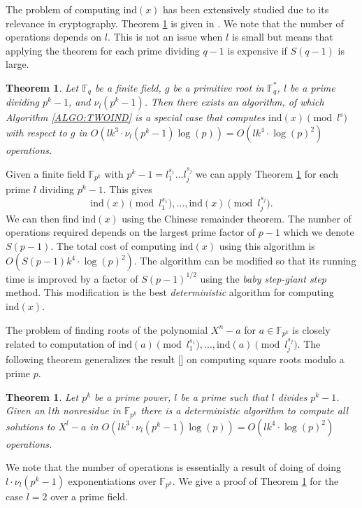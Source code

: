 \documentclass{article}
\newcounter{dummy} \numberwithin{dummy}{section}
\theoremstyle{plain}
\newtheorem{thm}[dummy]{Theorem}
\theoremstyle{definition}
\def\Fq {{ \mathbb{F} _ {q} }}
\def\FQ {{ \mathbb{F}^* _ {q} }}
\def\FpE {{ \mathbb{F} _ {p^k} }}
\def\ind {{ \mathrm{ind} }}
\begin{document}
		The problem of computing $\ind(x)$ has been extensively studied due to its relevance in cryptography. Theorem \ref{THM:ind} is given in \cite{hellman}. We note that the number of operations depends on $l$. This is not an issue when $l$ is small but means that applying the theorem for each prime dividing $q-1$ is expensive if $S(q-1)$ is large. 
		
		\begin{thm}
		\label{THM:ind}
		    Let $\Fq$ be a finite field, $g$ be a primitive root in $\FQ$, $l$ be a prime dividing $p^k-1$, and $\nu_l(p^k-1)$. Then there exists an algorithm, of which Algorithm \ref{ALGO:TWOIND} is a special case that computes $\ind(x) \pmod {l^s}$ with respect to $g$ in $O(lk^3 \cdot \nu_l(p^k - 1)\log(p))=O(lk^4 \cdot \log(p)^2)$ operations.
		\end{thm}
		
		Given a finite field $\FpE$ with $p^k-1=l_1^{s_1} \ldots l_j^{s_j}$ we can apply Theorem \ref{THM:ind} for each prime $l$ dividing $p^k-1$. This gives 
		\[ \ind(x) \pmod {l_1^{s_1}}, \ldots, \ind(x) \pmod {l_j^{s_j}}. \] 
		We can then find $\ind(x)$ using the Chinese remainder theorem. The number of operations required depends on the largest prime factor of $p-1$ which we denote $S(p-1)$. The total cost of computing $\ind(x)$ using this algorithm is $O(S(p-1)k^4 \cdot \log(p)^2)$. The algorithm can be modified so that its running time is improved by a factor of $S(p-1)^{1/2}$ using the \emph{baby step-giant step} method. This modification is the best \emph{deterministic} algorithm for computing $\ind(x)$.
		
		The problem of finding roots of the polynomial $X^n-a$ for $a \in \FpE$ is closely related to computation of $\ind(a) \pmod {l_1^{s_1}}, \ldots , \ind(a) \pmod {l_j^{s_j}}$. The following theorem generalizes the result [] on computing square roots modulo a prime $p$. 

		\begin{thm} 
		\label{THM:rootz}
				Let $p^k$ be a prime power, $l$ be a prime such that $l$ divides $p^k-1$. Given an $l$th nonresidue in $\FpE$ there is a deterministic algorithm to compute all solutions to $X^l-a$ in $O(lk^3 \cdot \nu_l(p^k - 1)\log(p))=O(lk^4 \cdot \log(p)^2)$ operations. 
		\end{thm}
		
		We note that the number of operations is essentially a result of doing of doing $l \cdot \nu_l(p^k - 1)$ exponentiations over $\FpE$. We give a proof of Theorem \ref{THM:rootz} for the case $l=2$ over a prime field. 
		
\end{document}
